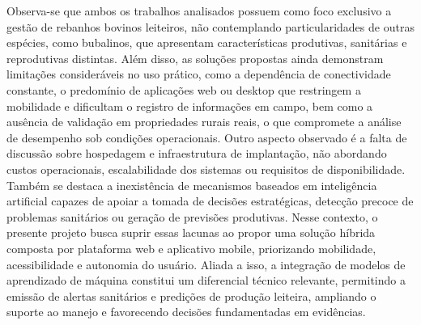 Observa-se que ambos os trabalhos analisados possuem como foco exclusivo a gestão de rebanhos bovinos leiteiros, não contemplando particularidades de outras espécies, como bubalinos, que apresentam características produtivas, sanitárias e reprodutivas distintas. Além disso, as soluções propostas ainda demonstram limitações consideráveis no uso prático, como a dependência de conectividade constante, o predomínio de aplicações web ou desktop que restringem a mobilidade e dificultam o registro de informações em campo, bem como a ausência de validação em propriedades rurais reais, o que compromete a análise de desempenho sob condições operacionais. Outro aspecto observado é a falta de discussão sobre hospedagem e infraestrutura de implantação, não abordando custos operacionais, escalabilidade dos sistemas ou requisitos de disponibilidade.  Também se destaca a inexistência de mecanismos baseados em inteligência artificial capazes de apoiar a tomada de decisões estratégicas, detecção precoce de problemas sanitários ou geração de previsões produtivas. Nesse contexto, o presente projeto busca suprir essas lacunas ao propor uma solução híbrida composta por plataforma web e aplicativo mobile, priorizando mobilidade, acessibilidade e autonomia do usuário. Aliada a isso, a integração de modelos de aprendizado de máquina constitui um diferencial técnico relevante, permitindo a emissão de alertas sanitários e predições de produção leiteira, ampliando o suporte ao manejo e favorecendo decisões fundamentadas em evidências.